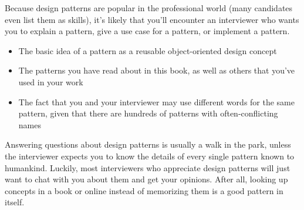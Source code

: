 
Because design patterns are popular in the professional world (many candidates even list them as skills), it’s likely that you’ll encounter an interviewer who wants you to explain a pattern, give a use case for a pattern, or implement a pattern.


\begin{itemize}
\item
The basic idea of a pattern as a reusable object-oriented design concept

\item
The patterns you have read about in this book, as well as others that you’ve used in your work

\item
The fact that you and your interviewer may use different words for the same pattern, given that there are hundreds of patterns with often-conflicting names
\end{itemize}


Answering questions about design patterns is usually a walk in the park, unless the interviewer expects you to know the details of every single pattern known to humankind. Luckily, most interviewers who appreciate design patterns will just want to chat with you about them and get your opinions. After all, looking up concepts in a book or online instead of memorizing them is a good pattern in itself.


